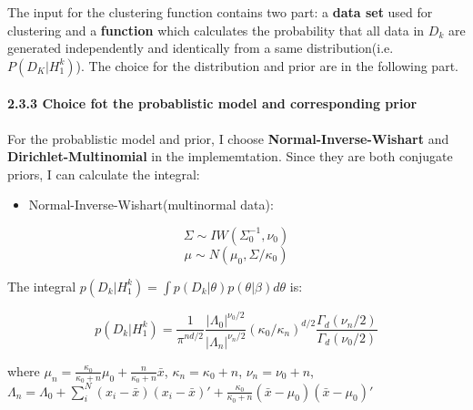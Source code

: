 \documentclass{article}
\begin{document}
The input for the clustering function contains two part: a \textbf{data
set} used for clustering and a \textbf{function} which calculates the
probability that all data in $D_k$ are generated independently and
identically from a same distribution(i.e. $P(D_K|H_1^k)$). The choice
for the distribution and prior are in the following part.

    \paragraph{2.3.3 Choice fot the probablistic model and corresponding
prior}\label{choice-fot-the-probablistic-model-and-corresponding-prior}

For the probablistic model and prior, I choose
\textbf{Normal-Inverse-Wishart} and \textbf{Dirichlet-Multinomial} in
the implememtation. Since they are both conjugate priors, I can
calculate the integral:

\begin{itemize}
\itemsep1pt\parskip0pt
\item
  Normal-Inverse-Wishart(multinormal data):
\end{itemize}

\[\Sigma \sim IW(\Sigma_0^{-1}, \nu_0)\]
\[\mu \sim N(\mu_0, \Sigma/\kappa_0)\]

The integral $p(D_k|H_1^k)= \int{p(D_k|\theta)p(\theta|\beta) d\theta}$
is:

\[p(D_k|H_1^k)= \frac{1}{\pi^{nd/2}}\frac{{|\Lambda_0|}^{\nu_0/2}}{{|\Lambda_n|}^{\nu_n/2}} (\kappa_0/\kappa_n)^{d/2} \frac{\Gamma_d(\nu_n/2)}{\Gamma_d(\nu_0/2)}\]

where
$\mu_n=\frac{\kappa_0}{\kappa_0+n}\mu_0+\frac{n}{\kappa_0+n}\bar{x}$,
$\kappa_n=\kappa_0+n$, $\nu_n=\nu_0+n$,
$\Lambda_n=\Lambda_0+\sum_i ^{N} (x_i-\bar{x})(x_i-\bar{x})'+\frac{\kappa_0}{\kappa_0+n}(\bar{x}-\mu_0)(\bar{x}-\mu_0)'$
\end{document}
